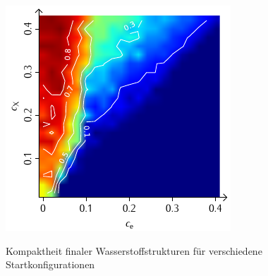 \documentclass[a4paper, 10pt, twoside, openany]{book} %
\begin{document}
\begin{figure}
\begin{minipage}[t]{0.48\textwidth}
        \label{H_individual_K}
    \end{minipage}
    \hfill
    \begin{minipage}[t]{0.48\textwidth}
        \includegraphics[width=\textwidth]{Abbildungen/Phasendiagramme/Konturen/H_penalty_individual_K.pdf}
        \label{H_penalty_individual_K}
    \end{minipage}
    \caption[Kompaktheit finaler Wasserstoffstrukturen]{Kompaktheit finaler Wasserstoffstrukturen für verschiedene Startkonfigurationen}
    \label{H_K}
\end{figure}
\end{document}
